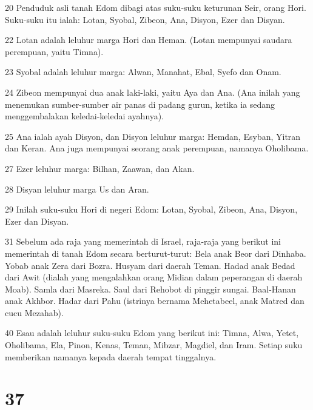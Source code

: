 \par 20 Penduduk asli tanah Edom dibagi atas suku-suku keturunan Seir, orang Hori. Suku-suku itu ialah: Lotan, Syobal, Zibeon, Ana, Disyon, Ezer dan Disyan.
\par 22 Lotan adalah leluhur marga Hori dan Heman. (Lotan mempunyai saudara perempuan, yaitu Timna).
\par 23 Syobal adalah leluhur marga: Alwan, Manahat, Ebal, Syefo dan Onam.
\par 24 Zibeon mempunyai dua anak laki-laki, yaitu Aya dan Ana. (Ana inilah yang menemukan sumber-sumber air panas di padang gurun, ketika ia sedang menggembalakan keledai-keledai ayahnya).
\par 25 Ana ialah ayah Disyon, dan Disyon leluhur marga: Hemdan, Esyban, Yitran dan Keran. Ana juga mempunyai seorang anak perempuan, namanya Oholibama.
\par 27 Ezer leluhur marga: Bilhan, Zaawan, dan Akan.
\par 28 Disyan leluhur marga Us dan Aran.
\par 29 Inilah suku-suku Hori di negeri Edom: Lotan, Syobal, Zibeon, Ana, Disyon, Ezer dan Disyan.
\par 31 Sebelum ada raja yang memerintah di Israel, raja-raja yang berikut ini memerintah di tanah Edom secara berturut-turut: Bela anak Beor dari Dinhaba. Yobab anak Zera dari Bozra. Husyam dari daerah Teman. Hadad anak Bedad dari Awit (dialah yang mengalahkan orang Midian dalam peperangan di daerah Moab). Samla dari Masreka. Saul dari Rehobot di pinggir sungai. Baal-Hanan anak Akhbor. Hadar dari Pahu (istrinya bernama Mehetabeel, anak Matred dan cucu Mezahab).
\par 40 Esau adalah leluhur suku-suku Edom yang berikut ini: Timna, Alwa, Yetet, Oholibama, Ela, Pinon, Kenas, Teman, Mibzar, Magdiel, dan Iram. Setiap suku memberikan namanya kepada daerah tempat tinggalnya.

\chapter{37}

